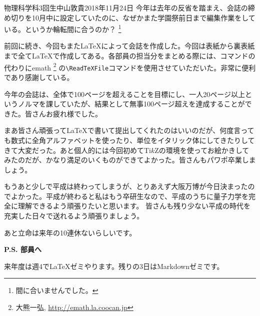 \documentclass[11pt,b5paper,papersize,dvipdfmx]{jsbook}
\begin{document}

\clearpage
\thispagestyle{empty}

\begin{hensyukoki}{物理科学科3回生}{中山敦貴}{2018年11月24日}
  今年は去年の反省を踏まえ、会誌の締め切りを10月中に設定していたのに、なぜかまた学園祭前日まで編集作業をしている。というか輪転間に合うのか？
    \footnote{間に合いませんでした。}\par
  前回に続き、今回もまた\LaTeX によって会誌を作成した。今回は表紙から裏表紙まで全て\LaTeX で作成してある。各部員の担当分をまとめる際には、\verb||コマンドの代わりにemath
    \footnote{大熊一弘, \url{http://emath.la.coocan.jp}}
  の\verb|\ReadTeXFile|コマンドを使用させていただいた。非常に便利であり感謝している。\par
  今年の会誌は、全体で100ページを超えることを目標にし、一人20ページ以上というノルマを課していたが、結果として無事100ページ超えを達成することができた。皆さんお疲れ様でした。\par
  まあ皆さん頑張って\LaTeX で書いて提出してくれたのはいいのだが、何度言っても数式に全角アルファベットを使ったり、単位をイタリック体にしてきたりしてきて大変だった。あと個人的には今回初めてTi$k$Zの環境を使ってお絵かきしてみたのだが、かなり満足のいくものができてよかった。皆さんもパワポ卒業しましょう。\par
  もうあと少しで平成は終わってしまうが、とりあえず大阪万博が今日決まったのでよかった。平成が終わると私はもう卒研生なので、平成のうちに量子力学を完全に理解できるよう頑張りたいと思います。
  皆さんも残り少ない平成の時代を充実した日々で送れるよう頑張りましょう。\par
  あと立命は来年の10連休ないらしいです。\par


\vspace{2zw}\noindent
{\bf P.S. 部員へ}\par
  来年度は週4で\LaTeX ゼミやります。残りの3日はMarkdownゼミです。

\end{hensyukoki}

\end{document}
